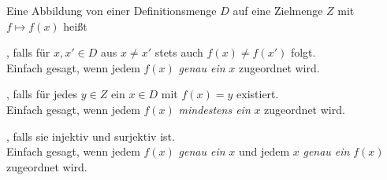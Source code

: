 Eine Abbildung von einer Definitionsmenge $D$ auf eine Zielmenge $Z$ mit $f \mapsto f(x)$ heißt
\begin{description}
    \item {}, falls für $x, x' \in D$ aus $x \neq x'$ stets auch $f(x) \neq f(x')$ folgt. \\
    Einfach gesagt, wenn jedem $f(x)$ \textit{genau ein} $x$ zugeordnet wird.
    \item {}, falls für jedes $y \in Z$ ein $x \in D$ mit $f(x) = y$ existiert. \\
    Einfach gesagt, wenn jedem $f(x)$ \textit{mindestens ein} $x$ zugeordnet wird.
    \item {}, falls sie injektiv und surjektiv ist. \\
    Einfach gesagt, wenn jedem $f(x)$ \textit{genau ein} $x$ und jedem $x$ \textit{genau ein} $f(x)$ zugeordnet wird.
\end{description}
